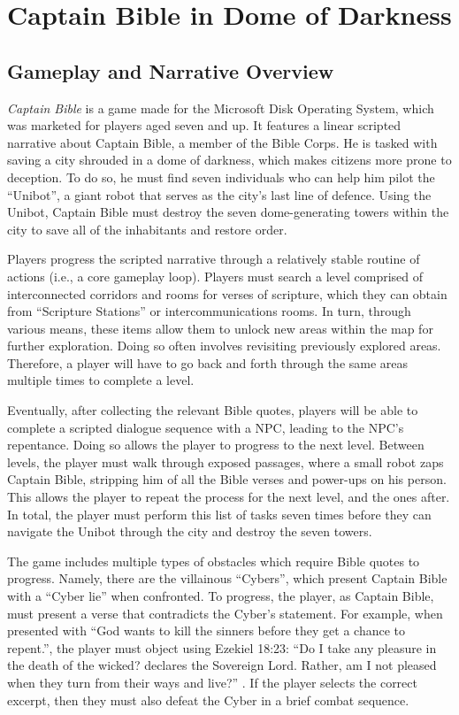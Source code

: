 \section{Captain Bible in Dome of Darkness}

\subsection{Gameplay and Narrative Overview}

\textit{Captain Bible} \parencite{engelbrite_captain_1994} is a game made for the Microsoft Disk Operating System, which was marketed for players aged seven and up. It features a linear scripted narrative about Captain Bible, a member of the Bible Corps. He is tasked with saving a city shrouded in a dome of darkness, which makes citizens more prone to deception. To do so, he must find seven individuals who can help him pilot the ``Unibot'', a giant robot that serves as the city's last line of defence. Using the Unibot, Captain Bible must destroy the seven dome-generating towers within the city to save all of the inhabitants and restore order.

Players progress the scripted narrative through a relatively stable routine of actions (i.e., a core gameplay loop). Players must search a level comprised of interconnected corridors and rooms for verses of scripture, which they can obtain from ``Scripture Stations'' or intercommunications rooms. In turn, through various means, these items allow them to unlock new areas within the map for further exploration. Doing so often involves revisiting previously explored areas. Therefore, a player will have to go back and forth through the same areas multiple times to complete a level.

Eventually, after collecting the relevant Bible quotes, players will be able to complete a scripted dialogue sequence with a \ac{NPC}, leading to the \ac{NPC}'s repentance. Doing so allows the player to progress to the next level. Between levels, the player must walk through exposed passages, where a small robot zaps Captain Bible, stripping him of all the Bible verses and power-ups on his person. This allows the player to repeat the process for the next level, and the ones after. In total, the player must perform this list of tasks seven times before they can navigate the Unibot through the city and destroy the seven towers.

The game includes multiple types of obstacles which require Bible quotes to progress. Namely, there are the villainous ``Cybers'', which present Captain Bible with a ``Cyber lie'' when confronted. To progress, the player, as Captain Bible, must present a verse that contradicts the Cyber's statement. For example, when presented with ``God wants to kill the sinners before they get a chance to repent.'', the player must object using Ezekiel 18:23: ``Do I take any pleasure in the death of the wicked? declares the Sovereign Lord. Rather, am I not pleased when they turn from their ways and live?'' \parencite{new_international_version_2011}. If the player selects the correct excerpt, then they must also defeat the Cyber in a brief combat sequence.

